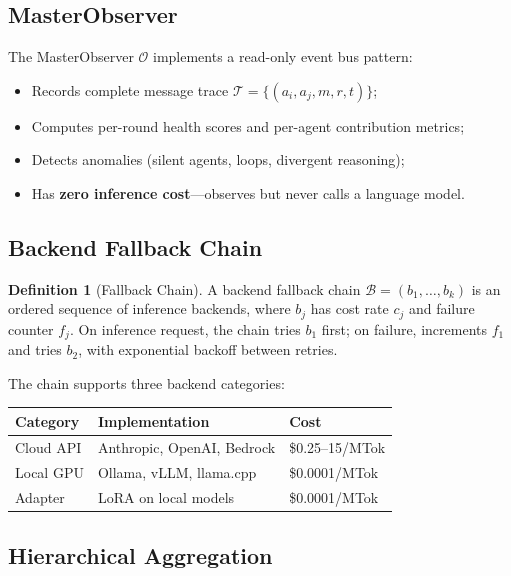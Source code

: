 \documentclass[a4paper,11pt]{article}
\theoremstyle{definition}
\newtheorem{definition}{Definition}[section]
\begin{document}
\subsection{MasterObserver}
\label{sec:observer}

The MasterObserver $\mathcal{O}$ implements a read-only event bus pattern:

\begin{itemize}
\item Records complete message trace $\mathcal{T} = \{(a_i, a_j, m, r, t)\}$;
\item Computes per-round health scores and per-agent contribution metrics;
\item Detects anomalies (silent agents, loops, divergent reasoning);
\item Has \textbf{zero inference cost}---observes but never calls a language model.
\end{itemize}

\subsection{Backend Fallback Chain}
\label{sec:backends}

\begin{definition}[Fallback Chain]
A backend fallback chain $\mathcal{B} = (b_1, \ldots, b_k)$ is an ordered sequence of inference backends, where $b_j$ has cost rate $c_j$ and failure counter $f_j$.
On inference request, the chain tries $b_1$ first; on failure, increments $f_1$ and tries $b_2$, with exponential backoff between retries.
\end{definition}

The chain supports three backend categories:

\begin{center}
\begin{tabular}{lll}
\toprule
\textbf{Category} & \textbf{Implementation} & \textbf{Cost} \\
\midrule
Cloud API & Anthropic, OpenAI, Bedrock & \$0.25--15/MTok \\
Local GPU & Ollama, vLLM, llama.cpp & \$0.0001/MTok \\
Adapter & LoRA on local models & \$0.0001/MTok \\
\bottomrule
\end{tabular}
\end{center}

\subsection{Hierarchical Aggregation}
\label{sec:aggregation}
\end{document}
